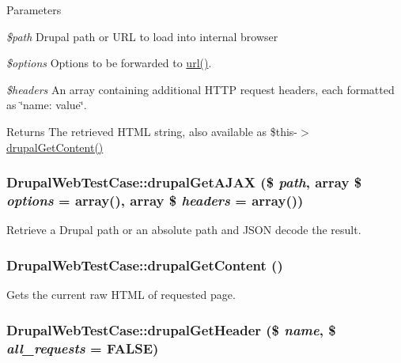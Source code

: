 \begin{DoxyParams}{Parameters}
\item[{\em \$path}]Drupal path or URL to load into internal browser \item[{\em \$options}]Options to be forwarded to \hyperlink{common_8inc_a43b2a0594431556db49df980801d8807}{url()}. \item[{\em \$headers}]An array containing additional HTTP request headers, each formatted as \char`\"{}name: value\char`\"{}. \end{DoxyParams}
\begin{DoxyReturn}{Returns}
The retrieved HTML string, also available as \$this-\/$>$\hyperlink{classDrupalWebTestCase_a65cc4334da96452d127a9fb50636e7bb}{drupalGetContent()} 
\end{DoxyReturn}
\hypertarget{classDrupalWebTestCase_a8ff95f6c8aa06587a6e73c8ae4bdfbe0}{
\subsubsection[{drupalGetAJAX}]{\setlength{\rightskip}{0pt plus 5cm}DrupalWebTestCase::drupalGetAJAX (\$ {\em path}, \/  array \$ {\em options} = {\ttfamily array()}, \/  array \$ {\em headers} = {\ttfamily array()})}}
\label{classDrupalWebTestCase_a8ff95f6c8aa06587a6e73c8ae4bdfbe0}
Retrieve a Drupal path or an absolute path and JSON decode the result. \hypertarget{classDrupalWebTestCase_a65cc4334da96452d127a9fb50636e7bb}{
\subsubsection[{drupalGetContent}]{\setlength{\rightskip}{0pt plus 5cm}DrupalWebTestCase::drupalGetContent ()}}
\label{classDrupalWebTestCase_a65cc4334da96452d127a9fb50636e7bb}
Gets the current raw HTML of requested page. \hypertarget{classDrupalWebTestCase_a2a5d661d1f61cf9ac2c8bb5969d5d373}{
\subsubsection[{drupalGetHeader}]{\setlength{\rightskip}{0pt plus 5cm}DrupalWebTestCase::drupalGetHeader (\$ {\em name}, \/  \$ {\em all\_\-requests} = {\ttfamily FALSE})}}

